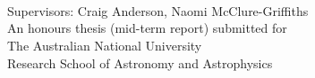 
\begin{titlepage}
  \begin{center}
    \makeatletter
    {\Huge\textbf{\@title}} \\[.4cm]
    {\Huge\textbf{\thesisqualifier}} \\[.4cm]
    {\huge\textbf{\@author}} \\ [.4cm]
    {\large Supervisors: Craig Anderson, Naomi McClure-Griffiths} \\[7cm]
    \makeatother
    {\large An honours thesis (mid-term report) submitted for \\
    The Australian National University \\
    Research School of Astronomy and Astrophysics}\\[2cm]
    {\LARGE \thismonth}
  \end{center}
\end{titlepage}
